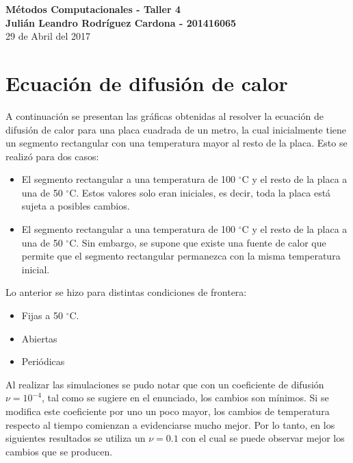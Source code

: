 \documentclass[12pt,letterpaper]{article}
\begin{document}
\begin{center}
{\Large \textbf{Métodos Computacionales - Taller 4}}\\
\vspace{0.3cm}
\textbf{Julián Leandro Rodríguez Cardona - 201416065}\\ \vspace{0.3cm}
29 de Abril del 2017
\end{center}

\section*{Ecuación de difusión de calor}

A continuación se presentan las gráficas obtenidas al resolver la ecuación de difusión de calor para una placa cuadrada de un metro, la cual inicialmente tiene un segmento rectangular con una temperatura mayor al resto de la placa. Esto se realizó para dos casos:

\begin{itemize}
\item El segmento rectangular a una temperatura de 100 $^{\circ}$C y el resto de la placa a una de 50 $^{\circ}$C. Estos valores solo eran iniciales, es decir, toda la placa está sujeta a posibles cambios.
\item El segmento rectangular a una temperatura de 100 $^{\circ}$C y el resto de la placa a una de 50 $^{\circ}$C. Sin embargo, se supone que existe una fuente de calor que permite que el segmento rectangular permanezca con la misma temperatura inicial.
\end{itemize}

Lo anterior se hizo para distintas condiciones de frontera:\\

\begin{itemize}
\item Fijas a 50 $^{\circ}$C.
\item Abiertas
\item Periódicas
\end{itemize}

Al realizar las simulaciones se pudo notar que con un coeficiente de difusión $\nu= 10^{-4}$, tal como se sugiere en el enunciado, los cambios son mínimos. Si se modifica este coeficiente por uno un poco mayor, los cambios de temperatura respecto al tiempo comienzan a evidenciarse mucho mejor. Por lo tanto, en los siguientes resultados se utiliza un $\nu=0.1$ con el cual se puede observar mejor los cambios que se producen.
\end{document}
